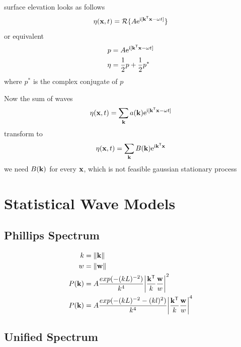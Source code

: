 surface elevation looks as follows
%
\begin{equation}
 \eta(\mathbf{x}, t) = \mathcal{R}\{A\mathrm{e}^{\mathrm{i}[\mathbf{k}^{\mathsf{T}}\mathbf{x} -
{\omega}t]}\}
\end{equation}
%
or equivalent
%
\begin{align}
 p &= A\mathrm{e}^{\mathrm{i}[\mathbf{k}^{\mathsf{T}}\mathbf{x} - {\omega}t]} \\
 \eta &= \frac{1}{2}p + \frac{1}{2}p^*
\end{align}
where $p^*$ is the complex conjugate of $p$

Now the sum of waves
%
\begin{equation}
 \eta(\mathbf{x}, t) = \sum_{\mathbf{k}}a(\mathbf{k})\mathrm{e}^{\mathrm{i}[\mathbf{k}^{\mathsf{T}}\mathbf{x} - {\omega}t]}
\end{equation}
%
transform to
\begin{equation}
 \eta(\mathbf{x}, t) = \sum_{\mathbf{k}}B(\mathbf{k})\mathrm{e}^{\mathrm{i}\mathbf{k}^{\mathsf{T}}\mathbf{x}}
\end{equation}
%
we need $B(\mathbf{k})$ for every $\mathbf{x}$, which is not feasible
%
gaussian stationary process


\section{Statistical Wave Models}

\subsection{Phillips Spectrum}
\label{sec_phillips_spectrum}

\begin{align}
  k &= \norm{\mvec{k}}\\
  w &= \norm{\mvec{w}}\\
  P(\mvec{k}) &= A\frac{exp(-(kL)^{-2})}{k^4}\abs*{\frac{\transpose{\mvec{k}}}{k}\frac{\mvec{w}}{w}}^2\\
  P(\mvec{k}) &= A\frac{exp(-(kL)^{-2}-(kl)^2)}{k^4}\abs*{\frac{\transpose{\mvec{k}}}{k}\frac{\mvec{w}}{w}}^4
\end{align}


\subsection{Unified Spectrum}
\label{sec_unified_spectrum}

